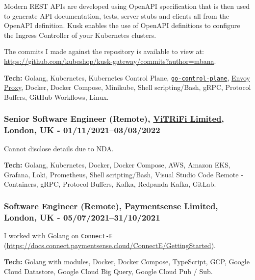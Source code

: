 \documentclass[
  a4paper,
]{article}
\begin{document}
\begin{multicols*}{2}
Modern REST APIs are developed using OpenAPI specification that is then
used to generate API documentation, tests, server stubs and clients all
from the OpenAPI definition. Kusk enables the use of OpenAPI definitions
to configure the Ingress Controller of your Kubernetes clusters.

The commits I made against the repository is available to view at:
\url{https://github.com/kubeshop/kusk-gateway/commits?author=mbana}.

\textbf{Tech:} Golang, Kubernetes, Kubernetes Control Plane,
\href{https://github.com/envoyproxy/go-control-plane}{\texttt{go-control-plane}},
\href{https://www.envoyproxy.io/}{Envoy Proxy}, Docker, Docker Compose,
Minikube, Shell scripting/Bash, gRPC, Protocol Buffers, GitHub
Workflows, Linux.

\hypertarget{senior-software-engineer-remote-vitrifi-limited-london-uk---0111202103032022}{%
\subsubsection{\texorpdfstring{Senior Software Engineer (Remote),
\href{https://vitrifi.net}{ViTRiFi Limited}, London, UK -
01/11/2021--03/03/2022}{Senior Software Engineer (Remote), ViTRiFi Limited, London, UK - 01/11/2021--03/03/2022}}\label{senior-software-engineer-remote-vitrifi-limited-london-uk---0111202103032022}}

Cannot disclose details due to NDA.

\textbf{Tech:} Golang, Kubernetes, Docker, Docker Compose, AWS, Amazon
EKS, Grafana, Loki, Prometheus, Shell scripting/Bash, Visual Studio Code
Remote - Containers, gRPC, Protocol Buffers, Kafka, Redpanda Kafka,
GitLab.

\hypertarget{software-engineer-remote-paymentsense-limited-london-uk---0507202131102021}{%
\subsubsection{\texorpdfstring{Software Engineer (Remote),
\href{https://www.paymentsense.com}{Paymentsense Limited}, London, UK -
05/07/2021--31/10/2021}{Software Engineer (Remote), Paymentsense Limited, London, UK - 05/07/2021--31/10/2021}}\label{software-engineer-remote-paymentsense-limited-london-uk---0507202131102021}}

I worked with Golang on \texttt{Connect-E}
(\url{https://docs.connect.paymentsense.cloud/ConnectE/GettingStarted}).

\textbf{Tech:} Golang with modules, Docker, Docker Compose, TypeScript,
GCP, Google Cloud Datastore, Google Cloud Big Query, Google Cloud Pub /
Sub.


\end{multicols*}
\end{document}
